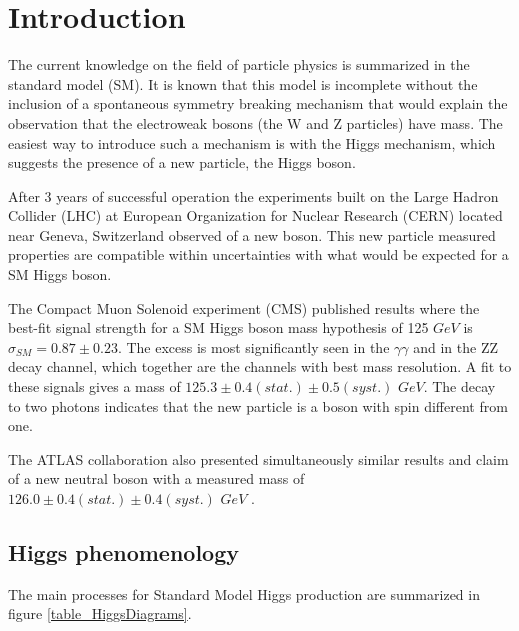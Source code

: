 \documentclass[%
reprint,
amsmath,
amssymb,
aps,
pra,
showkeys
]{revtex4-1}
\begin{document}
\setlength{\unitlength}{1mm}

\section{Introduction}

The current knowledge on the field of particle physics is summarized in the standard model (SM). It is known that
this model is incomplete without the inclusion of a spontaneous symmetry breaking mechanism that would explain
the observation that the electroweak bosons (the W and Z particles) have mass. The easiest way to introduce such
a mechanism is with the Higgs mechanism, which suggests the presence of a new particle, the Higgs boson.

After 3 years of successful operation the experiments built on the Large Hadron Collider (LHC) at European Organization 
for Nuclear Research (CERN) located near Geneva, Switzerland observed of a new boson. This new particle measured 
properties are compatible within uncertainties with what would be expected for a SM Higgs boson.

The Compact Muon Solenoid experiment (CMS) published results where the best-fit signal strength for a SM Higgs boson 
mass hypothesis of 125 $GeV$ is $\sigma_{SM}=0.87\pm0.23$. The excess is most significantly seen in the $\gamma\gamma$ 
and in the ZZ decay channel, which together are the channels with best mass resolution. A fit to these signals gives 
a mass of $125.3 \pm 0.4 (stat.) \pm 0.5 (syst.)$ $GeV$. The decay to two photons indicates that the new particle is 
a boson with spin different from one\cite{article:CMS-HIG-12-028}.

The ATLAS collaboration also presented simultaneously similar results and claim of a new neutral boson
with a measured mass of $126.0 \pm 0.4 (stat.) \pm 0.4 (syst.)$ $GeV$ \cite{article:CERN-PH-EP-2012-218}.

\subsection{Higgs phenomenology}

The main processes for Standard Model Higgs production are summarized in figure \ref{table_HiggsDiagrams}.
\end{document}
